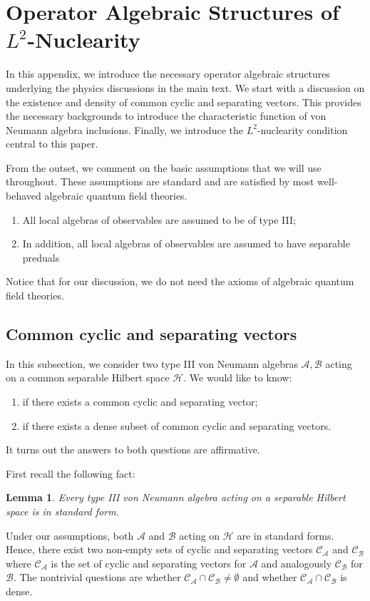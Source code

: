 \documentclass[a4paper,11pt]{article}
\newtheorem{lemma}[theorem]{Lemma}
\theoremstyle{definition}
\begin{document}

\appendix

\section{Operator Algebraic Structures of $L^2$-Nuclearity}\label{appendix:operatoralgebraicstructure}
In this appendix, we introduce the necessary operator algebraic structures underlying the physics discussions in the main text. We start with a discussion on the existence and density of common cyclic and separating vectors. This provides the necessary backgrounds to introduce the characteristic function of von Neumann algebra inclusions. Finally, we introduce the $L^2$-nuclearity condition central to this paper.

From the outset, we comment on the basic assumptions that we will use throughout. These assumptions are standard and are satisfied by most well-behaved algebraic quantum field theories.
\begin{enumerate}
    \item All local algebras of observables are assumed to be of type III;
    \item In addition, all local algebras of observables are assumed to have separable preduals
\end{enumerate}
Notice that for our discussion, we do not need the axioms of algebraic quantum field theories.
\subsection{Common cyclic and separating vectors}\label{subsection:common}
In this subsection, we consider two type III von Neumann algebras $\mathcal{A},\mathcal{B}$ acting on a common separable Hilbert space $\mathcal{H}$. We would like to know:
\begin{enumerate}
    \item if there exists a common cyclic and separating vector;
    \item if there exists a dense subset of common cyclic and separating vectors.
\end{enumerate}
It turns out the answers to both questions are affirmative.

First recall the following fact\cite{blackadar}:
\begin{lemma}\label{lemma:blackadar}
    Every type III von Neumann algebra acting on a separable Hilbert space is in standard form.
\end{lemma}
Under our assumptions, both $\mathcal{A}$ and $\mathcal{B}$ acting on $\mathcal{H}$ are in standard forms. Hence, there exist two non-empty sets of cyclic and separating vectors $\mathcal{C}_\mathcal{A}$ and $\mathcal{C}_\mathcal{B}$ where $\mathcal{C}_\mathcal{A}$ is the set of cyclic and separating vectors for $\mathcal{A}$ and analogously $\mathcal{C}_\mathcal{B}$ for $\mathcal{B}$. The nontrivial questions are whether $\mathcal{C}_\mathcal{A}\cap\mathcal{C}_\mathcal{B} \neq\emptyset$ and whether $\mathcal{C}_\mathcal{A}\cap\mathcal{C}_\mathcal{B}$ is dense. 
\end{document}

